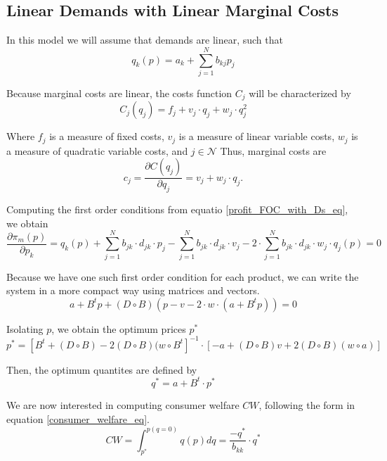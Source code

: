 \documentclass[12pt]{article}
\begin{document}
\subsection{Linear Demands with Linear Marginal Costs}

In this model we will assume that demands are linear, such that
\begin{equation*}
q_k(p) = a_k + \sum_{j=1}^N b_{kj}p_j
\end{equation*}

Because marginal costs are linear, the costs function $C_j$ will be characterized by
\begin{equation*}
C_j(q_j) = f_j + v_j \cdot q_j + w_j \cdot q_j^2
\end{equation*}

Where $f_j$ is a measure of fixed costs, $v_j$ is a measure of linear variable costs, $w_j$ is a measure of quadratic variable costs, and $j \in \mathcal{N}$ Thus, marginal costs are
\begin{equation*}
c_j = \frac{\partial C(q_j)}{\partial q_j}= v_j + w_j \cdot q_j.
\end{equation*}

Computing the first order conditions from equatio \ref{profit_FOC_with_Ds_eq}, we obtain
\begin{equation*}
\frac{\partial\pi_m(p)}{\partial p_k} = q_k(p) + \sum_{j = 1}^N b_{jk} \cdot d_{jk} \cdot p_j - \sum_{j = 1}^N b_{jk} \cdot d_{jk} \cdot v_j - 2 \cdot \sum_{j = 1}^N b_{jk} \cdot d_{jk} \cdot w_j \cdot q_j (p) = 0
\end{equation*}

Because we have one such first order condition for each product, we can write the system in a more compact way using matrices and vectors. 
\begin{equation*}
a + B ^ t p + (D \circ B)(p - v - 2 \cdot w \cdot (a + B^t p)) = 0
\end{equation*}

Isolating $p$, we obtain the optimum prices $p^*$
\begin{equation*}
p^* = [B^t + (D \circ B) - 2 (D \circ B)(w \circ B^t]^{-1} \cdot [-a + (D \circ B) v + 2 (D \circ B)(w \circ a)]
\end{equation*}

Then, the optimum quantites are defined by
\begin{equation*}
q^* = a + B^t \cdot p^*
\end{equation*}

We are now interested in computing consumer welfare $CW$, following the form in equation \ref{consumer_welfare_eq}.
\begin{equation*}
CW = \int_{p^*}^{p(q = 0)} q(p) dq = \frac{-q^*}{b_{kk}} \cdot q^*
\end{equation*}
\end{document}
